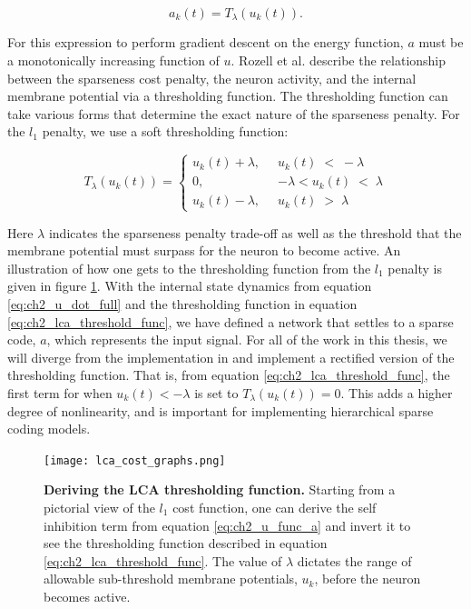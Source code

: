 \begin{equation}\label{eq:ch2_a_thresh}
  a_{k}(t) = T_{\lambda}(u_{k}(t)).
\end{equation}

For this expression to perform gradient descent on the energy function, $a$ must be a monotonically increasing function of $u$. Rozell et al. \citeyearpar{rozell2008sparse} describe the relationship between the sparseness cost penalty, the neuron activity, and the internal membrane potential via a thresholding function. The thresholding function can take various forms that determine the exact nature of the sparseness penalty. For the $l_{1}$ penalty, we use a soft thresholding function:

\begin{equation}\label{eq:ch2_lca_threshold_func}
    T_{\lambda}(u_{k}(t)) = \left\{
    \begin{aligned}
        u_{k}(t)+\lambda,\;\; &u_{k}(t)\; <\; -\lambda \\
        0,\;\; &-\lambda < u_{k}(t)\; <\; \lambda \\
        u_{k}(t)-\lambda,\;\; &u_{k}(t)\; >\; \lambda
    \end{aligned}
    \right.
\end{equation}

Here $\lambda$ indicates the sparseness penalty trade-off as well as the threshold that the membrane potential must surpass for the neuron to become active. An illustration of how one gets to the thresholding function from the $l_{1}$ penalty is given in figure \ref{fig:ch2_lca_thresh}. With the internal state dynamics from equation \eqref{eq:ch2_u_dot_full} and the thresholding function in equation \eqref{eq:ch2_lca_threshold_func}, we have defined a network that settles to a sparse code, $a$, which represents the input signal. For all of the work in this thesis, we will diverge from the implementation in \parencite{rozell2008sparse} and implement a rectified version of the thresholding function. That is, from equation \eqref{eq:ch2_lca_threshold_func}, the first term for when $u_{k}(t) < -\lambda$ is set to $T_{\lambda}(u_{k}(t))=0$. This adds a higher degree of nonlinearity, and is important for implementing hierarchical sparse coding models.

\begin{figure}[h]
    \centering %
    \texttt{[image: lca\_cost\_graphs.png]}
    \caption{\textbf{Deriving the LCA thresholding function.} Starting from a pictorial view of the $l_{1}$ cost function, one can derive the self inhibition term from equation \eqref{eq:ch2_u_func_a} and invert it to see the thresholding function described in equation \eqref{eq:ch2_lca_threshold_func}. The value of $\lambda$ dictates the range of allowable sub-threshold membrane potentials, $u_{k}$, before the neuron becomes active.}
    \label{fig:ch2_lca_thresh}
\end{figure}

